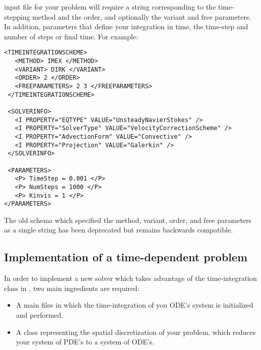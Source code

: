 {\nek} input file for your problem will require a string corresponding
to the time-stepping method and the order, and optionally the variant and
free parameters. In addition, parameters that define your integration
in time, the time-step and number of steps or final time. For
example:\\
\begin{lstlisting}[style=XMLStyle]
 <TIMEINTEGRATIONSCHEME>
   <METHOD> IMEX </METHOD>
   <VARIANT> DIRK </VARIANT>
   <ORDER> 2 </ORDER>
   <FREEPARAMETERS> 2 3 </FREEPARAMETERS>
 </TIMEINTEGRATIONSCHEME>

 <SOLVERINFO>
   <I PROPERTY="EQTYPE" VALUE="UnsteadyNavierStokes" />
   <I PROPERTY="SolverType" VALUE="VelocityCorrectionScheme" />
   <I PROPERTY="AdvectionForm" VALUE="Convective" /> 
   <I PROPERTY="Projection" VALUE="Galerkin" /> 
 </SOLVERINFO>
 
 <PARAMETERS>
   <P> TimeStep = 0.001 </P> 
   <P> NumSteps = 1000 </P> 
   <P> Kinvis = 1 </P>
</PARAMETERS>
\end{lstlisting}

The old schema which specified the method, variant, order, and free
parameters as a single string has been deprecated but remains
backwards compatible.


\subsection{Implementation of a time-dependent problem}
In order to implement a new solver which takes advantage of the
time-integration class in {\nek}, two main ingredients are required:
\begin{itemize}
\item A main files in which the time-integration of you ODE's system is
initialized and performed.
\item A class representing the spatial discretization of your problem, which
reduces your system of PDE's to a system of ODE's.
\end{itemize}

